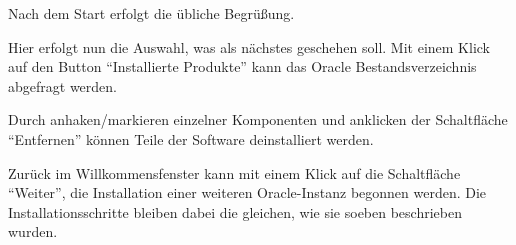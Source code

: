       Nach dem Start erfolgt die übliche Begrüßung.

      Hier erfolgt nun die Auswahl, was als nächstes geschehen soll. Mit einem Klick auf den Button \enquote{Installierte Produkte} kann das Oracle Bestandsverzeichnis abgefragt werden.

      Durch anhaken/markieren einzelner Komponenten und anklicken der Schaltfläche \enquote{Entfernen} können Teile der Software deinstalliert werden.

      Zurück im Willkommensfenster kann mit einem Klick auf die Schaltfläche \enquote{Weiter}, die Installation einer weiteren Oracle-Instanz begonnen werden. Die Installationsschritte bleiben dabei die gleichen, wie sie soeben beschrieben wurden.

